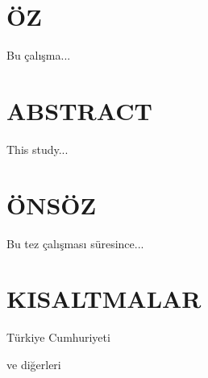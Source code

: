 \setdefaultlanguage{turkish}  %

\chapter*{ÖZ}  %
Bu çalışma...

\chapter*{ABSTRACT}
This study...

\chapter*{ÖNSÖZ}
Bu tez çalışması süresince...

\newpage  %

\setcounter{tocdepth}{2}  %
\tableofcontents  %

\renewcommand{\cftchapfont}{\bfseries}       %
\renewcommand{\cftsecfont}{\bfseries}        %
\renewcommand{\cftsubsecfont}{\normalfont}   %
\renewcommand{\cftchappagefont}{\bfseries}   %
\renewcommand{\cftsecpagefont}{\bfseries}

\newpage

\listoffigures  %

\listoftables   %

\newpage

\chapter*{KISALTMALAR}
\begin{description}[leftmargin=4cm]  %
  \item[T.C.] Türkiye Cumhuriyeti
  \item[vd.] ve diğerleri
\end{description}
